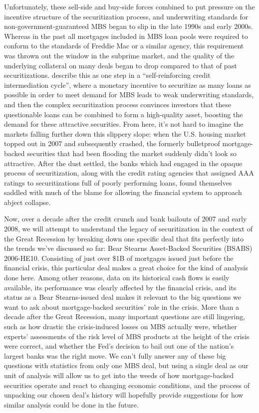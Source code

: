 \documentclass[12pt]{article}
\begin{document}
Unfortunately, these sell-side and buy-side forces combined to put pressure on the incentive structure of the securitization process, and underwriting standards for non-government-guaranteed MBS began to slip in the late 1990s and early 2000s. Whereas in the past all mortgages included in MBS loan pools were required to conform to the standards of Freddie Mac or a similar agency, this requirement was thrown out the window in the subprime market, and the quality of the underlying collateral on many deals began to drop compared to that of past securitizations. \textcite{segoviano13} describe this as one step in a “self-reinforcing credit intermediation cycle”, where a monetary incentive to securitize as many loans as possible in order to meet demand for MBS leads to weak underwriting standards, and then the complex securitization process convinces investors that these questionable loans can be combined to form a high-quality asset, boosting the demand for these attractive securities. From here, it’s not hard to imagine the markets falling further down this slippery slope: when the U.S. housing market topped out in 2007 and subsequently crashed, the formerly bulletproof mortgage-backed securities that had been flooding the market suddenly didn’t look so attractive. After the dust settled, the banks which had engaged in the opaque process of securitization, along with the credit rating agencies that assigned AAA ratings to securitizations full of poorly performing loans, found themselves saddled with much of the blame for allowing the financial system to approach abject collapse.

Now, over a decade after the credit crunch and bank bailouts of 2007 and early 2008, we will attempt to understand the legacy of securitization in the context of the Great Recession by breaking down one specific deal that fits perfectly into the trends we’ve discussed so far: Bear Stearns Asset-Backed Securities (BSABS) 2006-HE10. Consisting of just over \$1B of mortgages issued just before the financial crisis, this particular deal makes a great choice for the kind of analysis done here. Among other reasons, data on its historical cash flows is easily available, its performance was clearly affected by the financial crisis, and its status as a Bear Stearns-issued deal makes it relevant to the big questions we want to ask about mortgage-backed securities’ role in the crisis. More than a decade after the Great Recession, many important questions are still lingering, such as how drastic the crisis-induced losses on MBS actually were, whether experts’ assessments of the risk level of MBS products at the height of the crisis were correct, and whether the Fed’s decision to bail out one of the nation’s largest banks was the right move. We can’t fully answer any of these big questions with statistics from only one MBS deal, but using a single deal as our unit of analysis will allow us to get into the weeds of how mortgage-backed securities operate and react to changing economic conditions, and the process of unpacking our chosen deal’s history will hopefully provide suggestions for how similar analysis could be done in the future.
\end{document}

